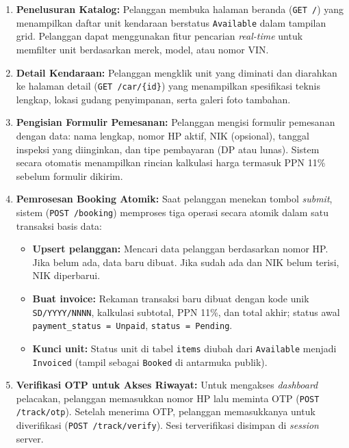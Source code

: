 \documentclass[11pt, a5paper]{article}
\begin{document}
\begin{enumerate}[label=\arabic*.]
  \item \textbf{Penelusuran Katalog:} Pelanggan membuka halaman beranda
        (\texttt{GET /}) yang menampilkan daftar unit kendaraan berstatus
        \texttt{Available} dalam tampilan grid. Pelanggan dapat menggunakan fitur
        pencarian \textit{real-time} untuk memfilter unit berdasarkan merek, model,
        atau nomor VIN.

  \item \textbf{Detail Kendaraan:} Pelanggan mengklik unit yang diminati dan
        diarahkan ke halaman detail (\texttt{GET /car/\{id\}}) yang menampilkan
        spesifikasi teknis lengkap, lokasi gudang penyimpanan, serta galeri foto
        tambahan.

  \item \textbf{Pengisian Formulir Pemesanan:} Pelanggan mengisi formulir
        pemesanan dengan data: nama lengkap, nomor HP aktif, NIK (opsional),
        tanggal inspeksi yang diinginkan, dan tipe pembayaran (DP atau lunas).
        Sistem secara otomatis menampilkan rincian kalkulasi harga termasuk PPN
        11\% sebelum formulir dikirim.

  \item \textbf{Pemrosesan Booking Atomik:} Saat pelanggan menekan tombol
        \textit{submit}, sistem (\texttt{POST /booking}) memproses tiga operasi
        secara atomik dalam satu transaksi basis data:
        \begin{itemize}
          \item \textbf{Upsert pelanggan:} Mencari data pelanggan berdasarkan
                nomor HP. Jika belum ada, data baru dibuat. Jika sudah ada dan
                NIK belum terisi, NIK diperbarui.
          \item \textbf{Buat invoice:} Rekaman transaksi baru dibuat dengan
                kode unik \texttt{SD/YYYY/NNNN}, kalkulasi subtotal, PPN 11\%,
                dan total akhir; status awal \texttt{payment\_status = Unpaid},
                \texttt{status = Pending}.
          \item \textbf{Kunci unit:} Status unit di tabel \texttt{items} diubah
                dari \texttt{Available} menjadi \texttt{Invoiced} (tampil sebagai
                \texttt{Booked} di antarmuka publik).
        \end{itemize}

  \item \textbf{Verifikasi OTP untuk Akses Riwayat:} Untuk mengakses
        \textit{dashboard} pelacakan, pelanggan memasukkan nomor HP lalu meminta
        OTP (\texttt{POST /track/otp}). Setelah menerima OTP, pelanggan
        memasukkanya untuk diverifikasi (\texttt{POST /track/verify}). Sesi
        terverifikasi disimpan di \textit{session} server.


\end{enumerate}
\end{document}
